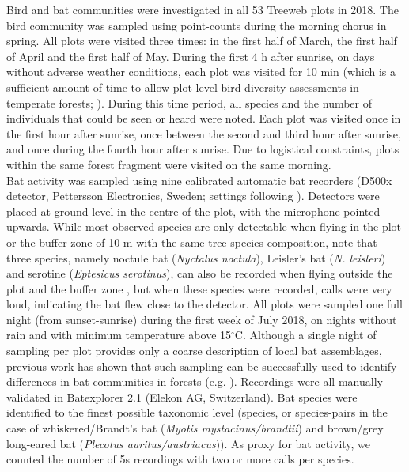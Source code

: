 \documentclass[10pt, twoside]{book} %
\begin{document}
Bird and bat communities were investigated in all 53 Treeweb plots in 2018. The bird community was sampled using point-counts during the morning chorus in spring. All plots were visited three times: in the first half of March, the first half of April and the first half of May. During the first 4 h after sunrise, on days without adverse weather conditions, each plot was visited for 10 min (which is a sufficient amount of time to allow plot-level bird diversity assessments in temperate forests; \citealt{Bonthoux2012}). During this time period, all species and the number of individuals that could be seen or heard were noted. Each plot was visited once in the first hour after sunrise, once between the second and third hour after sunrise, and once during the fourth hour after sunrise. Due to logistical constraints, plots within the same forest fragment were visited on the same morning.\\

Bat activity was sampled using nine calibrated automatic bat recorders (D500x detector, Pettersson Electronics, Sweden; settings following \citealt{Spoelstra2017}). Detectors were placed at ground-level in the centre of the plot, with the microphone pointed upwards. While most observed species are only detectable when flying in the plot or the buffer zone of 10 m with the same tree species composition, note that three species, namely noctule bat (\textit{Nyctalus noctula}), Leisler's bat (\textit{N. leisleri}) and serotine (\textit{Eptesicus serotinus}), can also be recorded when flying outside the plot and the buffer zone \citep{Barataud2015}, but when these species were recorded, calls were very loud, indicating the bat flew close to the detector. All plots were sampled one full night (from sunset-sunrise) during the first week of July 2018, on nights without rain and with minimum temperature above 15$^{\circ}$C. Although a single night of sampling per plot provides only a coarse description of local bat assemblages, previous work has shown that such sampling can be successfully used to identify differences in bat communities in forests (e.g. \citealt{Fuentes-Montemayor2013, Charbonnier2016}). Recordings were all manually validated in Batexplorer 2.1 (Elekon AG, Switzerland). Bat species were identified to the finest possible taxonomic level (species, or species-pairs in the case of whiskered/Brandt's bat (\textit{Myotis mystacinus/brandtii}) and brown/grey long-eared bat (\textit{Plecotus auritus/austriacus})). As proxy for bat activity, we counted the number of 5s recordings with two or more calls per species.\\
\end{document}
